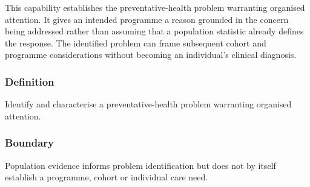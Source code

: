 This capability establishes the preventative-health problem warranting organised attention. It gives an intended programme a reason grounded in the concern being addressed rather than assuming that a population statistic already defines the response. The identified problem can frame subsequent cohort and programme considerations without becoming an individual's clinical diagnosis.

\subsubsection*{Definition}

Identify and characterise a preventative-health problem warranting organised attention.

\subsubsection*{Boundary}

Population evidence informs problem identification but does not by itself establish a programme, cohort or individual care need.

